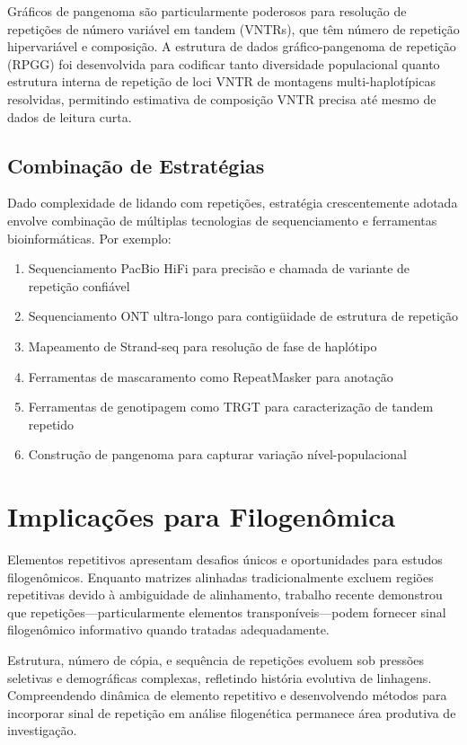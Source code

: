 Gráficos de pangenoma são particularmente poderosos para resolução de repetições de número variável em tandem (VNTRs), que têm número de repetição hipervariável e composição. A estrutura de dados gráfico-pangenoma de repetição (RPGG) foi desenvolvida para codificar tanto diversidade populacional quanto estrutura interna de repetição de loci VNTR de montagens multi-haplotípicas resolvidas, permitindo estimativa de composição VNTR precisa até mesmo de dados de leitura curta.

\subsection{Combinação de Estratégias}

Dado complexidade de lidando com repetições, estratégia crescentemente adotada envolve combinação de múltiplas tecnologias de sequenciamento e ferramentas bioinformáticas. Por exemplo:

\begin{enumerate}
\item Sequenciamento PacBio HiFi para precisão e chamada de variante de repetição confiável
\item Sequenciamento ONT ultra-longo para contigüidade de estrutura de repetição
\item Mapeamento de Strand-seq para resolução de fase de haplótipo
\item Ferramentas de mascaramento como RepeatMasker para anotação
\item Ferramentas de genotipagem como TRGT para caracterização de tandem repetido
\item Construção de pangenoma para capturar variação nível-populacional
\end{enumerate}

\section{Implicações para Filogenômica}

Elementos repetitivos apresentam desafios únicos e oportunidades para estudos filogenômicos. Enquanto matrizes alinhadas tradicionalmente excluem regiões repetitivas devido à ambiguidade de alinhamento, trabalho recente demonstrou que repetições---particularmente elementos transponíveis---podem fornecer sinal filogenômico informativo quando tratadas adequadamente.

Estrutura, número de cópia, e sequência de repetições evoluem sob pressões seletivas e demográficas complexas, refletindo história evolutiva de linhagens. Compreendendo dinâmica de elemento repetitivo e desenvolvendo métodos para incorporar sinal de repetição em análise filogenética permanece área produtiva de investigação.

